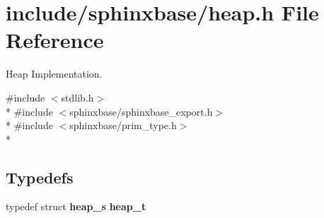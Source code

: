 \section{include/sphinxbase/heap.h File Reference}
\label{heap_8h}


Heap Implementation.  


{\ttfamily \#include $<$stdlib.\-h$>$}\\*
{\ttfamily \#include $<$sphinxbase/sphinxbase\-\_\-export.\-h$>$}\\*
{\ttfamily \#include $<$sphinxbase/prim\-\_\-type.\-h$>$}\\*
\subsection*{Typedefs}
\begin{DoxyCompactItemize}
\item 
typedef struct {\bf heap\-\_\-s} {\bfseries heap\-\_\-t}\label{heap_8h_a0ffa4ec8648c254bf19eee352b69dc7a}

\end{DoxyCompactItemize}
